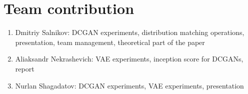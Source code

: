 \documentclass{article}
\begin{document}
\section{Team contribution}
\begin{enumerate}
        \item Dmitriy Salnikov: DCGAN experiments,
            distribution matching operations, presentation,
            team management, theoretical part of the paper
        \item Aliaksandr Nekrashevich: VAE experiments,
            inception score for DCGANs, report
        \item Nurlan Shagadatov: DCGAN experiments, VAE experiments, presentation
\end{enumerate}



\end{document}
